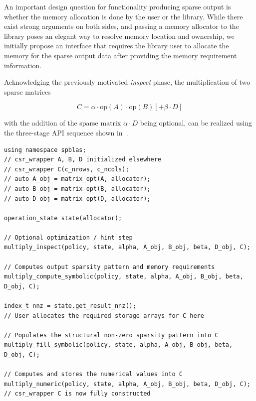 \documentclass[manuscript,review]{acmart}
\begin{document}
An important design question for functionality producing sparse output is whether the memory allocation is done by the user or the library. While there exist strong arguments on both sides, and passing a memory allocator to the library poses an elegant way to resolve memory location and ownership, we initially propose an interface that requires the library user to allocate the memory for the sparse output data after providing the memory requirement information. 

Acknowledging the previously motivated \textit{inspect} phase, the multiplication of two sparse matrices 

\begin{equation}
\label{eq:SpGEMM}
C = \alpha \cdot \text{op}(A) \cdot \text{op}(B) [ + \beta \cdot D]
\end{equation}

with the addition of the sparse matrix $\alpha \cdot D$ being optional, %
can be realized using the three-stage API sequence shown in~.
\begin{listing}[htbp]
\caption{Three-stage API sequence for explicit symbolic/numeric separation in \texttt{SpGEMM}.}
\label{lst:spgemm_threestage}
\begin{verbatim}
using namespace spblas;
// csr_wrapper A, B, D initialized elsewhere
// csr_wrapper C(c_nrows, c_ncols);
// auto A_obj = matrix_opt(A, allocator);
// auto B_obj = matrix_opt(B, allocator);
// auto D_obj = matrix_opt(D, allocator);

operation_state state(allocator);

// Optional optimization / hint step
multiply_inspect(policy, state, alpha, A_obj, B_obj, beta, D_obj, C);

// Computes output sparsity pattern and memory requirements
multiply_compute_symbolic(policy, state, alpha, A_obj, B_obj, beta, D_obj, C);

index_t nnz = state.get_result_nnz();
// User allocates the required storage arrays for C here

// Populates the structural non-zero sparsity pattern into C
multiply_fill_symbolic(policy, state, alpha, A_obj, B_obj, beta, D_obj, C);

// Computes and stores the numerical values into C
multiply_numeric(policy, state, alpha, A_obj, B_obj, beta, D_obj, C);
// csr_wrapper C is now fully constructed
\end{verbatim}
\end{listing}
\end{document}
